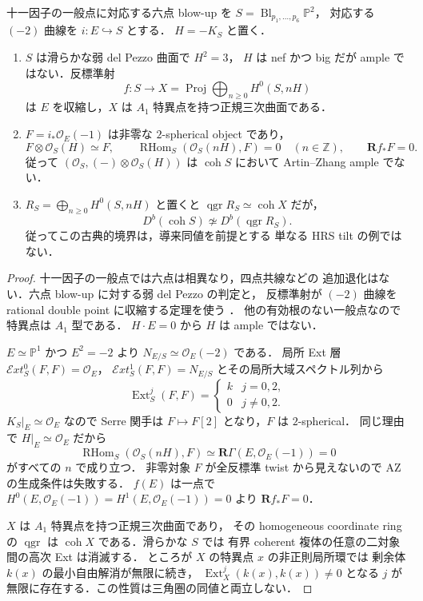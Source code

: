 \begin{theorem}[一つの根壁では導来圏も異なる]
\label{thm:classical-root-wall}
十一因子の一般点に対応する六点 blow-up を
$S=\operatorname{Bl}_{p_1,\ldots,p_6}\mathbb P^2$，
対応する $(-2)$ 曲線を $i:E\hookrightarrow S$ とする．
$H=-K_S$ と置く．
\begin{enumerate}
\item $S$ は滑らかな弱 del Pezzo 曲面で $H^2=3$，
$H$ は nef かつ big だが ample ではない．反標準射
\[
f:S\longrightarrow X=\operatorname{Proj}\bigoplus_{n\ge0}H^0(S,nH)
\]
は $E$ を収縮し，$X$ は $A_1$ 特異点を持つ正規三次曲面である．
\item $F=i_*\mathcal O_E(-1)$ は非零な $2$-spherical object であり，
\[
F\otimes\mathcal O_S(H)\simeq F,\qquad
\operatorname{RHom}_S(\mathcal O_S(nH),F)=0\quad(n\in\mathbb Z),
\qquad \mathbf Rf_*F=0.
\]
従って $(\mathcal O_S,(-)\otimes\mathcal O_S(H))$ は
$\operatorname{coh}S$ において Artin--Zhang ample でない．
\item $R_S=\bigoplus_{n\ge0}H^0(S,nH)$ と置くと
$\operatorname{qgr}R_S\simeq\operatorname{coh}X$ だが，
\[
\boxed{D^b(\operatorname{coh}S)\not\simeq
       D^b(\operatorname{qgr}R_S).}
\]
従ってこの古典的境界は，導来同値を前提とする
単なる HRS tilt の例ではない．
\end{enumerate}
\end{theorem}
\begin{proof}
十一因子の一般点では六点は相異なり，四点共線などの
追加退化はない．六点 blow-up に対する弱 del Pezzo の判定と，
反標準射が $(-2)$ 曲線を rational double point に収縮する定理を使う
\cite[Introduction, \S4]{BlancLamy}
\cite[Theorem 8.3.2]{Dolgachev}．
他の有効根のない一般点なので特異点は $A_1$ 型である．
$H\cdot E=0$ から $H$ は ample ではない．

$E\simeq\mathbb P^1$ かつ $E^2=-2$ より
$N_{E/S}\simeq\mathcal O_E(-2)$ である．
局所 Ext 層 $\mathcal Ext_S^0(F,F)=\mathcal O_E$，
$\mathcal Ext_S^1(F,F)=N_{E/S}$ とその局所大域スペクトル列から
\[
\operatorname{Ext}^j_S(F,F)=
\begin{cases}k&j=0,2,\\0&j\ne0,2.\end{cases}
\]
$K_S|_E\simeq\mathcal O_E$ なので Serre 関手は
$F\mapsto F[2]$ となり，$F$ は $2$-spherical．
同じ理由で $H|_E\simeq\mathcal O_E$ だから
\[
\operatorname{RHom}_S(\mathcal O_S(nH),F)
\simeq\mathbf R\Gamma(E,\mathcal O_E(-1))=0
\]
がすべての $n$ で成り立つ．
非零対象 $F$ が全反標準 twist から見えないので
AZ の生成条件は失敗する．
$f(E)$ は一点で $H^0(E,\mathcal O_E(-1))
=H^1(E,\mathcal O_E(-1))=0$ より $\mathbf Rf_*F=0$．

$X$ は $A_1$ 特異点を持つ正規三次曲面であり，
その homogeneous coordinate ring の $\operatorname{qgr}$ は
$\operatorname{coh}X$ である．滑らかな $S$ では
有界 coherent 複体の任意の二対象間の高次 Ext は消滅する．
ところが $X$ の特異点 $x$ の非正則局所環では
剰余体 $k(x)$ の最小自由解消が無限に続き，
$\operatorname{Ext}_X^j(k(x),k(x))\ne0$ となる $j$ が
無限に存在する．この性質は三角圏の同値と両立しない．
\end{proof}

